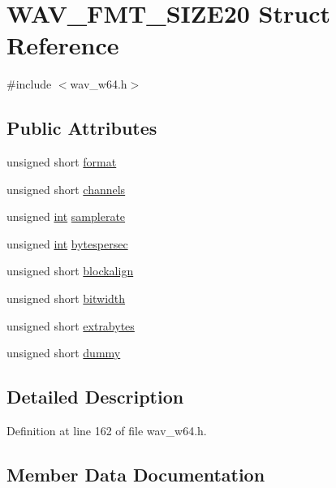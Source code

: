 \hypertarget{struct_w_a_v___f_m_t___s_i_z_e20}{}\section{W\+A\+V\+\_\+\+F\+M\+T\+\_\+\+S\+I\+Z\+E20 Struct Reference}
\label{struct_w_a_v___f_m_t___s_i_z_e20}


{\ttfamily \#include $<$wav\+\_\+w64.\+h$>$}

\subsection*{Public Attributes}
\begin{DoxyCompactItemize}
\item 
unsigned short \hyperlink{struct_w_a_v___f_m_t___s_i_z_e20_a751cae567750e9d51fa4c45e73547c72}{format}
\item 
unsigned short \hyperlink{struct_w_a_v___f_m_t___s_i_z_e20_a57119fcb5420cc2bd7708713ccefde13}{channels}
\item 
unsigned \hyperlink{xmltok_8h_a5a0d4a5641ce434f1d23533f2b2e6653}{int} \hyperlink{struct_w_a_v___f_m_t___s_i_z_e20_a4526766461389f27c1d0e72ae46ad9b8}{samplerate}
\item 
unsigned \hyperlink{xmltok_8h_a5a0d4a5641ce434f1d23533f2b2e6653}{int} \hyperlink{struct_w_a_v___f_m_t___s_i_z_e20_abfb4140bf774b99624623b5efad914bc}{bytespersec}
\item 
unsigned short \hyperlink{struct_w_a_v___f_m_t___s_i_z_e20_a94ca6862da9f28f74f7c870f0412f2de}{blockalign}
\item 
unsigned short \hyperlink{struct_w_a_v___f_m_t___s_i_z_e20_abd5cbcb0154487f790f76ecfb16dbc74}{bitwidth}
\item 
unsigned short \hyperlink{struct_w_a_v___f_m_t___s_i_z_e20_ac7d5f93e88fa37f62be75275a2f7b850}{extrabytes}
\item 
unsigned short \hyperlink{struct_w_a_v___f_m_t___s_i_z_e20_adc66c80f09c595bd35fe128363321c20}{dummy}
\end{DoxyCompactItemize}


\subsection{Detailed Description}


Definition at line 162 of file wav\+\_\+w64.\+h.



\subsection{Member Data Documentation}
